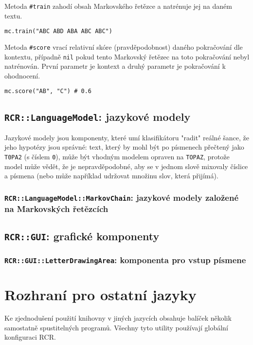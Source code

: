 \documentclass[a4paper]{article}
\begin{document}
Metoda \texttt{\#train} zahodí obsah Markovského řetězce a natrénuje jej na
daném textu.
\begin{lstlisting}
mc.train("ABC ABD ABA ABC ABC")
\end{lstlisting}

Metoda \texttt{\#score} vrací relativní skóre (pravděpodobnost) daného
pokračování dle kontextu, případně \texttt{nil} pokud tento Markovský řetězec
na toto pokračování nebyl natrénován. První parametr je kontext a druhý parametr
je pokračování k ohodnocení.
\begin{lstlisting}
mc.score("AB", "C") # 0.6
\end{lstlisting}


\subsection{\texttt{RCR::LanguageModel}: jazykové modely}
Jazykové modely jsou komponenty, které umí klasifikátoru "radit"
reálné šance, že jeho hypotézy jsou správné: text,
který by mohl být po písmenech přečtený jako \texttt{T0PA2} (s číslem
\texttt{0}), může být vhodným modelem opraven na \texttt{TOPAZ}, protože
model může vědět, že je nepravděpodobné, aby se v jednom slově mixovaly
číslice a písmena (nebo může například udržovat množinu slov, která
přijímá).


\subsubsection{\texttt{RCR::LanguageModel::MarkovChain}: jazykové modely
založené na Markovských řetězcích}

\subsection{\texttt{RCR::GUI}: grafické komponenty}
\subsubsection{\texttt{RCR::GUI::LetterDrawingArea}: komponenta pro vstup
písmene}

\section{Rozhraní pro ostatní jazyky}
Ke zjednodušení použití knihovny v jiných jazycích obsahuje balíček několik
samostatně spustitelných programů. Všechny tyto utility používají globální
konfiguraci RCR.
\end{document}
